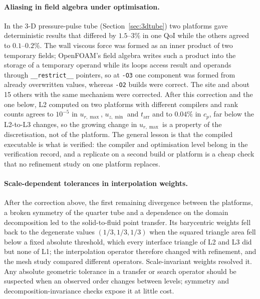 \paragraph{Aliasing in field algebra under optimisation.}
In the 3-D pressure-pulse tube (Section~\ref{sec:3dtube}) two platforms gave deterministic results that differed by $1.5$--$3\%$ in one QoI while the others agreed to $0.1$--$0.2\%$.
The wall viscous force was formed as an inner product of two temporary fields; OpenFOAM's field algebra writes such a product into the storage of a temporary operand while its loops access result and operands through \texttt{\_\_restrict\_\_} pointers, so at \texttt{-O3} one component was formed from already overwritten values, whereas \texttt{-O2} builds were correct.
The site and about 15 others with the same mechanism were corrected.
After this correction and the one below, L2 computed on two platforms with different compilers and rank counts agrees to $10^{-5}$ in $u_{r,\max}$, $u_{z,\min}$ and $t_\mathrm{arr}$ and to $0.04\%$ in $c_p$, far below the L2-to-L3 changes, so the growing change in $u_{r,\max}$ is a property of the discretisation, not of the platform.
The general lesson is that the compiled executable is what is verified: the compiler and optimisation level belong in the verification record, and a replicate on a second build or platform is a cheap check that no refinement study on one platform replaces.

\paragraph{Scale-dependent tolerances in interpolation weights.}
After the correction above, the first remaining divergence between the platforms, a broken symmetry of the quarter tube and a dependence on the domain decomposition led to the solid-to-fluid point transfer.
Its barycentric weights fell back to the degenerate values $(1/3, 1/3, 1/3)$ when the squared triangle area fell below a fixed absolute threshold, which every interface triangle of L2 and L3 did but none of L1; the interpolation operator therefore changed with refinement, and the mesh study compared different operators.
Scale-invariant weights resolved it.
Any absolute geometric tolerance in a transfer or search operator should be suspected when an observed order changes between levels; symmetry and decomposition-invariance checks expose it at little cost.

